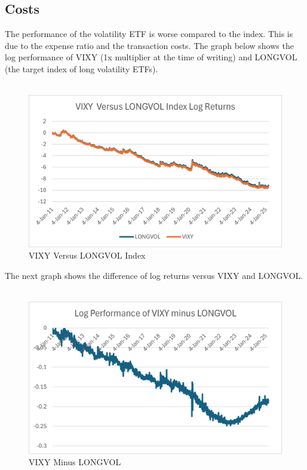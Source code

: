 \documentclass[11pt, oneside]{book}
\begin{document}
\subsection{Costs} \label{ETFs-Drawbacks-Costs}
The performance of the volatility ETF is worse compared to the index. This is due to the expense ratio and the transaction costs. The graph below shows the log performance of VIXY (1x multiplier at the time of writing) and LONGVOL (the target index of long volatility ETFs).\\
\\
\begin{figure}[H]
\centering
\includegraphics[width=\textwidth]{VIXYVersusLONGVOL.png}
\caption{VIXY Versus LONGVOL Index} \label{Fig-VIXYVersusLONGVOL}
\end{figure}
\noindent
The next graph shows the difference of log returns versus VIXY and LONGVOL.\\
\\
\begin{figure}[H]
\centering
\includegraphics[width=\textwidth]{VIXYMinusLONGVOL.png}
\caption{VIXY Minus LONGVOL} \label{Fig-VIXYMinusLONGVOL}
\end{figure}
\noindent
\end{document}
